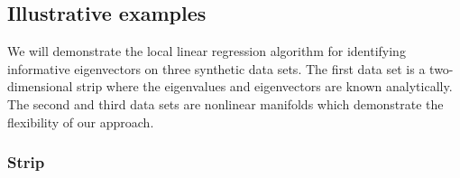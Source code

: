 \documentclass[preprint]{elsarticle}
\begin{document}
\subsection{Illustrative examples} \label{sec:illustrative_examples}

We will demonstrate the local linear regression algorithm for identifying informative eigenvectors on three synthetic data sets. 
%
The first data set is a two-dimensional strip where the eigenvalues and eigenvectors are known analytically.
%
The second and third data sets are nonlinear manifolds which demonstrate the flexibility of our approach. 

\subsubsection{Strip}
\end{document}
